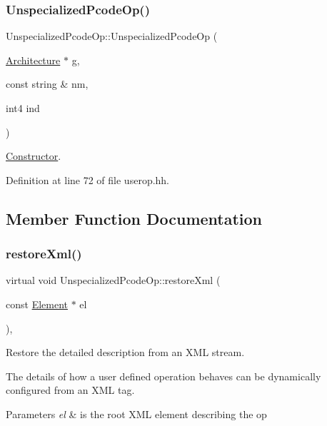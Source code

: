 \subsubsection{\texorpdfstring{UnspecializedPcodeOp()}{UnspecializedPcodeOp()}}
{\footnotesize\ttfamily Unspecialized\+Pcode\+Op\+::\+Unspecialized\+Pcode\+Op (\begin{DoxyParamCaption}\item[{\mbox{\hyperlink{class_architecture}{Architecture}} $\ast$}]{g,  }\item[{const string \&}]{nm,  }\item[{int4}]{ind }\end{DoxyParamCaption})\hspace{0.3cm}{\ttfamily [inline]}}



\mbox{\hyperlink{class_constructor}{Constructor}}. 



Definition at line 72 of file userop.\+hh.



\subsection{Member Function Documentation}
\mbox{\label{class_unspecialized_pcode_op_a3e3e33005e96d5daef2aa26234d02d51}} 
\subsubsection{\texorpdfstring{restoreXml()}{restoreXml()}}
{\footnotesize\ttfamily virtual void Unspecialized\+Pcode\+Op\+::restore\+Xml (\begin{DoxyParamCaption}\item[{const \mbox{\hyperlink{class_element}{Element}} $\ast$}]{el }\end{DoxyParamCaption})\hspace{0.3cm}{\ttfamily [inline]}, {\ttfamily [virtual]}}



Restore the detailed description from an X\+ML stream. 

The details of how a user defined operation behaves can be dynamically configured from an X\+ML tag. 
\begin{DoxyParams}{Parameters}
{\em el} & is the root X\+ML element describing the op \\
\hline
\end{DoxyParams}


